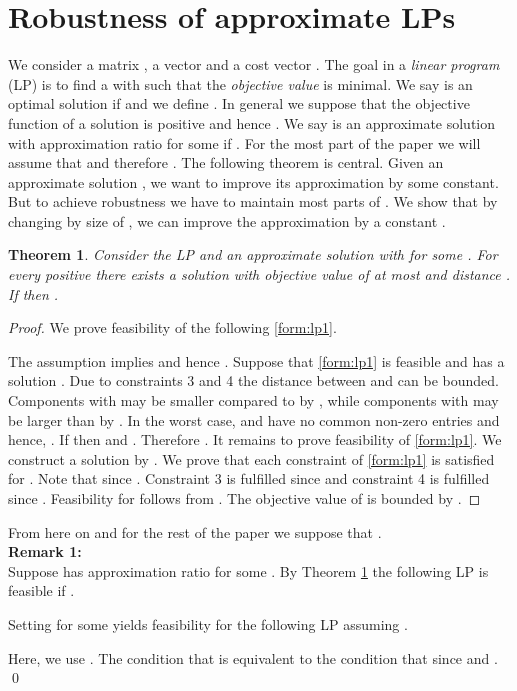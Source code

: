 \documentclass[a4paper,11pt]{article}
\newtheorem{thm}{Theorem}
\begin{document}
\section{Robustness of approximate LPs}
We consider a matrix , a vector  and a cost vector
.
The goal in a \emph{linear program} (LP) is to find a  with  such that the
\emph{objective value}  is minimal.
We say  is an optimal solution if  
and we define . In general we suppose that the objective function of a solution
is positive and hence .
We say  is an approximate solution with approximation ratio  for some 
 if . For the most part of the paper we will assume that
 and therefore .
The following theorem is central. Given an approximate solution , we want to improve its
approximation by some constant. But to achieve robustness we have to maintain most
parts of . We show that by changing  by size of , 
we can improve the approximation by a constant .
\begin{thm}
  \label{thm1}
  Consider the LP  and an approximate solution  with  for some .  For every positive  there 
  exists a solution  with objective value of at most  and distance .
  If  then .
\end{thm}
\begin{proof}
   We prove feasibility of the following \ref{form:lp1}. 
  
  The assumption  implies 
   and hence .
  Suppose that \ref{form:lp1} is feasible and has a solution . Due to constraints 3 and 4 the distance between 
  and  can be bounded. Components  with  may be smaller compared to  by
  , while components  with
   may be larger than  by .
  In the worst case,  and  have no common non-zero entries 
  and hence, .
	If  then  and . Therefore  .
  It remains to prove feasibility of \ref{form:lp1}.
  We construct a solution  by 
  .
	We prove that each constraint of \ref{form:lp1}	is satisfied for . Note that  since
	.
	Constraint 3 is fulfilled since  and
	constraint 4 is fulfilled since .
  Feasibility for  follows from 
  .
  The objective value of  is bounded by
  .
\end{proof}
From here on and for the rest of the paper we suppose that .\\
{\bf Remark 1:\\}
Suppose  has approximation ratio  for some .
By Theorem \ref{thm1} the following LP is feasible if .

Setting  for some  yields feasibility for the following
LP assuming .

Here, we use . The condition that  is equivalent to the condition that
 since  and . \qed
\end{document}
